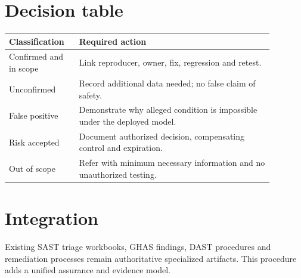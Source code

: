 \documentclass[10pt,letterpaper]{article}
\begin{document}
\section{Decision table}
\begin{longtable}{@{}p{0.22\linewidth}p{0.66\linewidth}@{}}\toprule Classification & Required action\\\midrule
Confirmed and in scope & Link reproducer, owner, fix, regression and retest.\\
Unconfirmed & Record additional data needed; no false claim of safety.\\
False positive & Demonstrate why alleged condition is impossible under the deployed model.\\
Risk accepted & Document authorized decision, compensating control and expiration.\\
Out of scope & Refer with minimum necessary information and no unauthorized testing.\\\bottomrule\end{longtable}
\section{Integration}
Existing SAST triage workbooks, GHAS findings, DAST procedures and remediation processes remain authoritative specialized artifacts. This procedure adds a unified assurance and evidence model.
\end{document}
